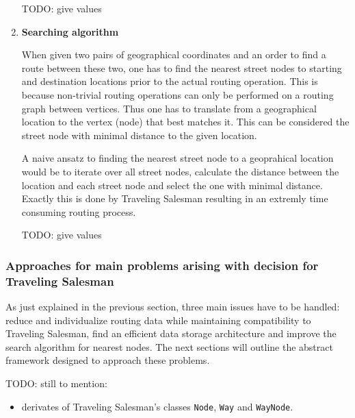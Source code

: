 \begin{enumerate}
		TODO: give values
											
	\item \textbf{Searching algorithm}
	
		When given two pairs of geographical coordinates and an order to find a route between these two, one has to find the nearest street nodes to starting and destination locations prior to the actual routing operation. This is because non-trivial routing operations can only be performed on a routing graph between vertices. Thus one has to translate from a geographical location to the vertex (node) that best matches it. This can be considered the street node with minimal distance to the given location.\newline
				
		A naive ansatz to finding the nearest street node 	to a geoprahical location would be to iterate over all street nodes, calculate the distance between the location and each street node and select the one with minimal distance. Exactly this is done by Traveling Salesman resulting in an extremly time consuming routing process.\newline
		
		TODO: give values

\end{enumerate}


\subsubsection{Approaches for main problems arising with decision for Traveling Salesman}
\label{sec:routing_mobiletsm_approaches}

As just explained in the previous section, three main issues have to be handled: reduce and individualize routing data while maintaining compatibility to Traveling Salesman, find an efficient data storage architecture and improve the search algorithm for nearest nodes. The next sections will outline the abstract framework designed to approach these problems.\newline

TODO: still to mention:
\begin{itemize}
	\item derivates of Traveling Salesman's classes \texttt{Node}, \texttt{Way} and \texttt{WayNode}.
\end{itemize}

